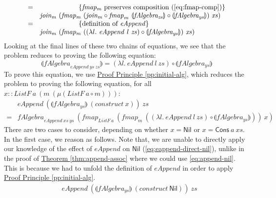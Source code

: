 \documentclass{jfp1}
\newcommand{\fold}[1]{\llparenthesis #1 \rrparenthesis}
\newcommand{\eqAnnotation}[1]{\hspace{2cm}\left\{\textrm{#1}\right\}}
\newcommand{\proofprinref}[1]{\hyperref[#1]{Proof Principle \ref*{#1}}}
\newcommand{\thmref}[1]{\hyperref[#1]{Theorem \ref*{#1}}}
\begin{document}
\begin{proof*}
\begin{displaymath}
\begin{array}{cl}
      =&\eqAnnotation{$\mathit{fmap_m}$ preserves composition (\autoref{eq:fmap-comp})} \\
      &\mathit{join_m}~(\mathit{fmap_m}~(\mathit{join_m} \circ \mathit{fmap}_m~\fold{\mathit{fAlgebra_{zs}}} \circ \fold{\mathit{fAlgebra_{ys}}})~\mathit{xs}) \\
      =&\eqAnnotation{definition of $\mathit{eAppend}$} \\
      &\mathit{join_m}~(\mathit{fmap_m}~((\lambda l.~\mathit{eAppend}~l~\mathit{zs}) \circ \fold{\mathit{fAlgebra_{ys}}})~\mathit{xs})
    \end{array}
  \end{displaymath}
  Looking at the final lines of these two chains of equations, we see
  that the problem reduces to proving the following equation:
  \begin{displaymath}
    \fold{\mathit{fAlgebra}_{\mathit{eAppend}~\mathit{ys}~\mathit{zs}}} = (\lambda l.~\mathit{eAppend}~l~\mathit{zs}) \circ \fold{\mathit{fAlgebra_{ys}}}
  \end{displaymath}
  To prove this equation, we use \proofprinref{pp:initial-alg}, which
  reduces the problem to proving the following equation, for all $x ::
  \mathit{ListF}~a~(m~(\mu(\mathit{ListF}~a \circ m)))$:
  \begin{displaymath}
    \begin{array}{cl}
      &\mathit{eAppend}~(\fold{\mathit{fAlgebra_{ys}}}~(\mathit{construct}~x))~\mathit{zs} \\
      =& \mathit{fAlgebra}_{\mathit{eAppend}~\mathit{xs}~\mathit{ys}}~(\mathit{fmap}_{\mathit{ListF}~a}~(\mathit{fmap}_m~((\lambda l.~\mathit{eAppend}~l~\mathit{zs}) \circ \fold{\mathit{fAlgebra_{ys}}}))~x)
    \end{array}
  \end{displaymath}
  There are two cases to consider, depending on whether $x =
  \mathsf{Nil}$ or $x = \mathsf{Cons}~a~\mathit{xs}$. In the first
  case, we reason as follows. Note that, we are unable to directly
  apply our knowledge of the effect of $\mathit{eAppend}$ on
  $\mathsf{Nil}$ (\autoref{eq:eappend-direct-nil}), unlike in the
  proof of \thmref{thm:append-assoc} where we could use
  \autoref{eq:append-nil}. This is because we had to unfold the
  definition of $\mathit{eAppend}$ in order to apply
  \proofprinref{pp:initial-alg}.
  \begin{displaymath}
    \begin{array}{cl}
      &\mathit{eAppend}~(\fold{\mathit{fAlgebra_{ys}}}~(\mathit{construct}~\mathsf{Nil}))~\mathit{zs} \\

\end{array}
\end{displaymath}
\end{proof*}
\end{document}
